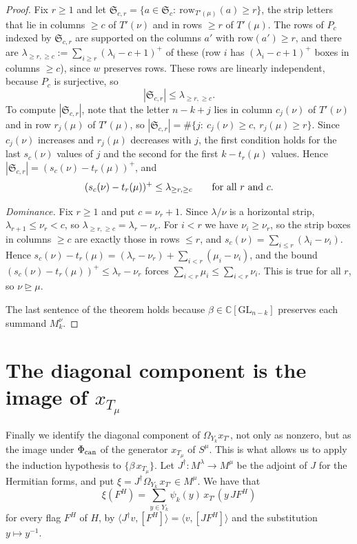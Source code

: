 \documentclass[11pt, letterpaper]{amsart}
\let\amstext\text
\renewcommand{\text}[1]{\amstext{\upshape #1}}%
\theoremstyle{definition}
\theoremstyle{remark}
\newcommand{\CC}{\mathbb{C}}
\newcommand{\GL}{\mathrm{GL}}
\newcommand{\row}{\mathrm{row}}
\begin{document}
\begin{proof}
Fix $r\ge1$ and let $\mathfrak S_{c,r}=\{a\in\mathfrak S_c:\ \row_{T'(\mu)}(a)\ge r\}$, the strip letters that lie in columns $\ge c$ of $T'(\nu)$ and in rows $\ge r$ of $T'(\mu)$. The rows of $P_c$ indexed by $\mathfrak S_{c,r}$ are supported on the columns $a'$ with $\row(a')\ge r$, and there are $\lambda_{\ge r,\ge c}:=\sum_{i\ge r}(\lambda_i-c+1)^+$ of these (row $i$ has $(\lambda_i-c+1)^+$ boxes in columns $\ge c$), since $w$ preserves rows. These rows are linearly independent, because $P_c$ is surjective, so
\[
|\mathfrak S_{c,r}|\le\lambda_{\ge r,\ge c}.
\]
To compute $|\mathfrak S_{c,r}|$, note that the letter $n-k+j$ lies in column $c_j(\nu)$ of $T'(\nu)$ and in row $r_j(\mu)$ of $T'(\mu)$, so $|\mathfrak S_{c,r}|=\#\{j:\ c_j(\nu)\ge c,\ r_j(\mu)\ge r\}$. Since $c_j(\nu)$ increases and $r_j(\mu)$ decreases with $j$, the first condition holds for the last $s_c(\nu)$ values of $j$ and the second for the first $k-t_r(\mu)$ values. Hence $|\mathfrak S_{c,r}|=(s_c(\nu)-t_r(\mu))^+$, and
\[
(s_c(\nu)-t_r(\mu))^+\le\lambda_{\ge r,\ge c}\qquad\text{for all $r$ and $c$.}
\]

\emph{Dominance.} Fix $r\ge1$ and put $c=\nu_r+1$. Since $\lambda/\nu$ is a horizontal strip, $\lambda_{r+1}\le\nu_r<c$, so $\lambda_{\ge r,\ge c}=\lambda_r-\nu_r$. For $i<r$ we have $\nu_i\ge\nu_r$, so the strip boxes in columns $\ge c$ are exactly those in rows $\le r$, and $s_c(\nu)=\sum_{i\le r}(\lambda_i-\nu_i)$. Hence $s_c(\nu)-t_r(\mu)=(\lambda_r-\nu_r)+\sum_{i<r}(\mu_i-\nu_i)$, and the bound $(s_c(\nu)-t_r(\mu))^+\le\lambda_r-\nu_r$ forces $\sum_{i<r}\mu_i\le\sum_{i<r}\nu_i$. This is true for all $r$, so $\nu\trianglerighteq\mu$.

The last sentence of the theorem holds because $\beta\in\CC[\GL_{n-k}]$ preserves each summand $M_k^{\nu}$.
\end{proof}

\section{The diagonal component is the image of \texorpdfstring{$x_{T_\mu}$}{x(Tmu)}}\label{secdiag}

Finally we identify the diagonal component of $\Omega_{Y_k}x_{T'}$, not only as nonzero, but as the image under $\Phi_{\rm can}$ of the generator $x_{T_\mu}$ of $S^\mu$. This is what allows us to apply the induction hypothesis to $\{\beta\,x_{T_\mu}\}$. Let $J^\dagger\colon M^\lambda\to M^\mu$ be the adjoint of $J$ for the Hermitian forms, and put $\xi=J^\dagger \Omega_{Y_k}\,x_{T'}\in M^\mu$. We have that
\[
\xi(F^H)=\sum_{y\in Y_k}\psi_k(y)\,x_{T'}(y\,JF^H)
\]
for every flag $F^H$ of $H$, by $\langle J^\dagger v,[F^H]\rangle=\langle v,[JF^H]\rangle$ and the substitution $y\mapsto y^{-1}$.
\end{document}
